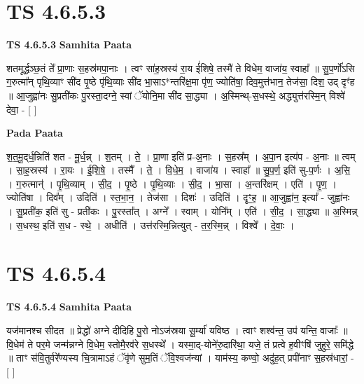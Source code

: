 \documentclass[17pt]{extarticle}
\begin{document}

\section{ TS 4.6.5.3 }

\textbf{TS 4.6.5.3 } \newline
\textbf{Samhita Paata} \newline

शतमूर्द्धञ्छ॒तं ते᳚ प्रा॒णाः स॒हस्र॑मपा॒नाः । त्वꣳ सा॑ह॒स्रस्य॑ रा॒य ई॑शिषे॒ तस्मै॑ ते विधेम॒ वाजा॑य॒ स्वाहा᳚ ॥ सु॒प॒र्णो॑ऽसि ग॒रुत्मा᳚न् पृथि॒व्याꣳ सी॑द पृ॒ष्ठे पृ॑थि॒व्याः सी॑द भा॒साऽ*न्तरि॑क्ष॒मा पृ॑ण॒ ज्योति॑षा॒ दिव॒मुत्त॑भान॒ तेज॑सा॒ दिश॒ उद् दृꣳ॑ह ॥ आ॒जुह्वा॑नः सु॒प्रती॑कः पु॒रस्ता॒दग्ने॒ स्वां ॅयोनि॒मा सी॑द सा॒द्ध्या । अ॒स्मिन्थ्-स॒धस्थे॒ अद्ध्युत्त॑रस्मि॒न् विश्वे॑ देवा॒ - [  ] \newline

\textbf{Pada Paata} \newline

श॒त॒मू॒द्‌र्ध॒न्निति॑ शत - मू॒र्ध॒न्न् । श॒तम् । ते॒ । प्रा॒णा इति॑ प्र-अ॒नाः । स॒हस्र᳚म् । अ॒पा॒न इत्य॑प - अ॒नाः ॥ त्वम् । सा॒ह॒स्रस्य॑ । रा॒यः । ई॒शि॒षे॒ । तस्मै᳚ । ते॒ । वि॒धे॒म॒ । वाजा॑य । स्वाहा᳚ ॥ सु॒प॒र्ण॒ इति॑ सु-प॒र्णः । अ॒सि॒ । ग॒रुत्मान्॑ । पृ॒थि॒व्याम् । सी॒द॒ । पृ॒ष्ठे । पृ॒थि॒व्याः । सी॒द॒ । भा॒सा । अ॒न्तरि॑क्षम् । एति॑ । पृ॒ण॒ । ज्योति॑षा । दिव᳚म् । उदिति॑ । स्त॒भा॒न॒ । तेज॑सा । दिशः॑ । उदिति॑ । दृꣳ॒॒ह॒ ॥ आ॒जुह्वा॑न॒ इत्या᳚ - जुह्वा॑नः । सु॒प्रती॑क॒ इति॑ सु - प्रती॑कः । पु॒रस्ता᳚त् । अग्ने᳚ । स्वाम् । योनि᳚म् । एति॑ । सी॒द॒ । सा॒द्ध्या ॥ अ॒स्मिन्न् । स॒धस्थ॒ इति॑ स॒ध - स्थे॒ । अधीति॑ । उत्त॑रस्मि॒न्नित्युत् - त॒र॒स्मि॒न्न् । विश्वे᳚ । दे॒वाः॒ ।  \newline





\section{ TS 4.6.5.4 }

\textbf{TS 4.6.5.4 } \newline
\textbf{Samhita Paata} \newline

यज॑मानश्च सीदत ॥ प्रेद्धो॑ अग्ने दीदिहि पु॒रो नोऽज॑स्रया सू॒र्म्या॑ यविष्ठ । त्वाꣳ शश्व॑न्त॒ उप॑ यन्ति॒ वाजाः᳚ ॥ वि॒धेम॑ ते पर॒मे जन्म॑न्नग्ने वि॒धेम॒ स्तोमै॒रव॑रे स॒धस्थे᳚ । यस्मा॒द्-योने॑रु॒दारि॑था॒ यजे॒ तं प्रत्वे ह॒वीꣳषि॑ जुहुरे॒ समि॑द्धे ॥ ताꣳ स॑वि॒तुर्वरे᳚ण्यस्य चि॒त्रामाऽहं ॅवृ॑णे सुम॒तिं ॅवि॒श्वज॑न्यां । याम॑स्य॒ कण्वो॒ अदु॑ह॒त् प्रपी॑नाꣳ स॒हस्र॑धारां॒ - [  ] \newline
\end{document}
